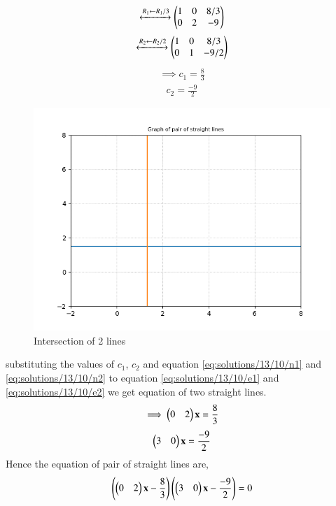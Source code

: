 \begin{align}
\xleftrightarrow[]{R_1\leftarrow R_1/3}\begin{pmatrix}1&0&8/3\\0&2&-9\end{pmatrix}
\end{align}
\begin{align}
\xleftrightarrow[]{R_2\leftarrow R_2/2}\begin{pmatrix}1&0&8/3\\0&1&-9/2\end{pmatrix}
\end{align}
\begin{align}
\implies c_1 = \frac{8}{3}
\end{align}
\begin{align}
c_2 = \frac{-9}{2}
\end{align}
\begin{figure}[ht!]
\centering
\includegraphics[width=\columnwidth]{./solutions/13/10/Figure_1.png}
\caption{Intersection of 2 lines}
\label{eq:solutions/13/10/Figure_1}
\end{figure}
substituting the values of $c_1$, $c_2$ and equation \eqref{eq:solutions/13/10/n1} and \eqref{eq:solutions/13/10/n2} to equation \eqref{eq:solutions/13/10/e1} and \eqref{eq:solutions/13/10/e2} we get equation of two straight lines.
\begin{align}
\implies \begin{pmatrix}0&2\end{pmatrix}\mathbf{x} = \frac{8}{3}
\end{align}
\begin{align}
\begin{pmatrix}3&0\end{pmatrix}\mathbf{x} = \frac{-9}{2}
\end{align}
Hence the equation of pair of straight lines are,
\begin{align}
\left(\begin{pmatrix}0&2\end{pmatrix}\mathbf{x}-\frac{8}{3}\right)\left(\begin{pmatrix}3&0\end{pmatrix}\mathbf{x} - \frac{-9}{2}\right) = 0
\label{eq:solutions/13/10/pair}
\end{align}
